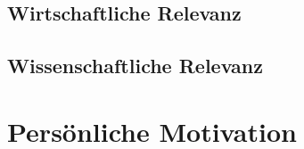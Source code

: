 \documentclass[10pt]{article}
\begin{document}
        \subsection{Wirtschaftliche Relevanz}\label{sec:Wirtschaftliche}

        \subsection{Wissenschaftliche Relevanz}\label{sec:Wissenschaftliche}

    \section{Persönliche Motivation}\label{sec:Motivation}
        \cite[Entwicklungsprojekt]{cobanmai2021}  

     
    
\end{document}
